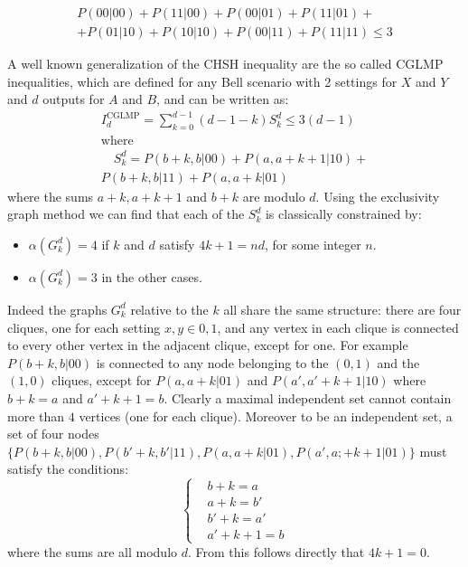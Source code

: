 \documentclass[letterpaper]{article}
\begin{document}

\begin{multline}
 P(00\vert 00) + P(11 \vert 00) + P(00\vert 01) + P(11 \vert 01) + \\
 +P(01 \vert 10) + P(10 \vert 10) + P(00 \vert 11) + P(11 \vert 11) \leq 3
\label{eq:chsh_ineq}
\end{multline}

A well known generalization of the CHSH inequality are the so called CGLMP
\cite{cglmp} inequalities, which are defined for any Bell scenario with 2
settings for $X$ and $Y$ and $d$ outputs for $A$ and $B$, and can be written as:
\begin{gather}
    I_d^{\mathrm{CGLMP}} = \sum_{k=0}^{d-1} (d-1-k) S^d_k \le 3 (d-1)\\ \nonumber
    \text{where}\\
    \quad S^d_k = P(b+k,b|00) + P(a, a+k+1|10) +\\ \nonumber
    P(b+k, b | 11) +
    P(a, a+k | 01)
    \label{eq:GCLMP}
\end{gather}
where the sums $a+k, a+k+1$ and $b+k$ are modulo $d$.
Using the exclusivity graph method we can find that each of the $S^d_k$ is
classically constrained by:
\begin{itemize}
    \item $\alpha(G^d_k) = 4$ if $k$ and $d$ satisfy $4k+1=nd$, for some
        integer $n$.
    \item $\alpha(G^d_k) = 3$ in the other cases.
\end{itemize}
Indeed the graphs $G^d_k$ relative to the $k$ all share the same structure:
there are four cliques, one for each setting $x,y \in {0,1}$, and any vertex in each clique is
connected to every other vertex in the adjacent clique, except for one.
For example $P(b+k,b|00)$ is connected to any node belonging to the $(0,1)$ and the
$(1,0)$ cliques, except for $P(a,a+k|01)$ and $P(a',a'+k+1|10)$ where $b+k = a$ and
$a'+k+1 = b$.
Clearly a maximal independent set cannot contain more than $4$ vertices (one for
each clique).
Moreover to be an independent set, a set of four nodes $\{P(b+k,b|00),
P(b'+k,b'|11), P(a,a+k|01), P(a',a;+k+1|01)\}$ must satisfy the conditions:
\begin{equation}
    \left\{
        \begin{aligned}
            &b + k = a \\
            &a + k = b' \\
            &b' + k = a' \\
            &a' + k + 1 = b 
        \end{aligned}
    \right.
    \label{eq:four_indipset_condition}
\end{equation}
where the sums are all modulo $d$.
From this follows directly that $4k+1 = 0$. 
\end{document}
